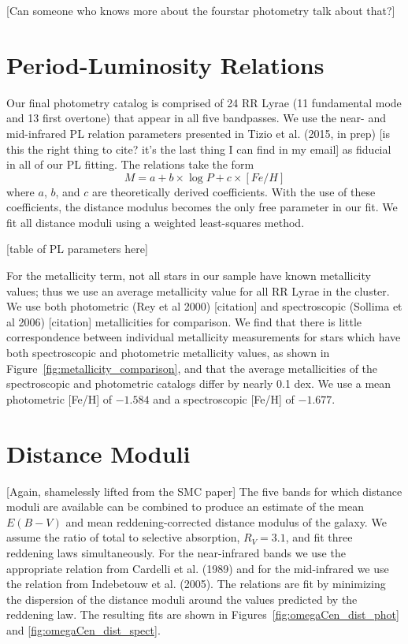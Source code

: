 \documentclass[a4paper,fleqn,usenatbib]{mnras}
\begin{document}
[Can someone who knows more about the fourstar photometry talk about that?]

\section{Period-Luminosity Relations}
\label{sec:pl_relation}

Our final photometry catalog is comprised of 24 RR Lyrae (11 fundamental mode and 13 first overtone) that appear in all five bandpasses. We use the near- and mid-infrared PL relation parameters presented in Tizio et al. (2015, in prep) [is this the right thing to cite? it's the last thing I can find in my email] as fiducial in all of our PL fitting. The relations take the form
\begin{equation}M = a + b\times\log P + c\times[Fe/H]\end{equation}
where $a$, $b$, and $c$ are theoretically derived coefficients.
With the use of these coefficients, the distance modulus becomes the only free parameter in our fit. We fit all distance moduli using a weighted least-squares method.

[table of PL parameters here]

For the metallicity term, not all stars in our sample have known metallicity values; thus we use an average metallicity value for all RR Lyrae in the cluster. We use both photometric (Rey et al 2000) [citation] and spectroscopic (Sollima et al 2006) [citation] metallicities for comparison. We find that there is little correspondence between individual metallicity measurements for stars which have both spectroscopic and photometric metallicity values, as shown in Figure~\ref{fig:metallicity_comparison}, and that the average metallicities of the spectroscopic and photometric catalogs differ by nearly 0.1 dex. We use a mean photometric [Fe/H] of  $-1.584$ and a spectroscopic [Fe/H] of $-1.677$.



\section{Distance Moduli}
\label{sec:distance_moduli}

[Again, shamelessly lifted from the SMC paper]
The five bands for which distance moduli are available can be combined to produce an estimate of the mean $E(B - V)$ and mean reddening-corrected distance modulus of the galaxy. We assume the ratio of total to selective absorption, $R_V = 3.1$, and fit three reddening laws simultaneously. For the near-infrared bands we use the appropriate relation from Cardelli et al. (1989) and for the mid-infrared we use the relation from Indebetouw et al. (2005). The relations are fit by minimizing the dispersion of the distance moduli around the values predicted by the reddening law. The resulting fits are shown in Figures~\ref{fig:omegaCen_dist_phot} and \ref{fig:omegaCen_dist_spect}.
\end{document}
